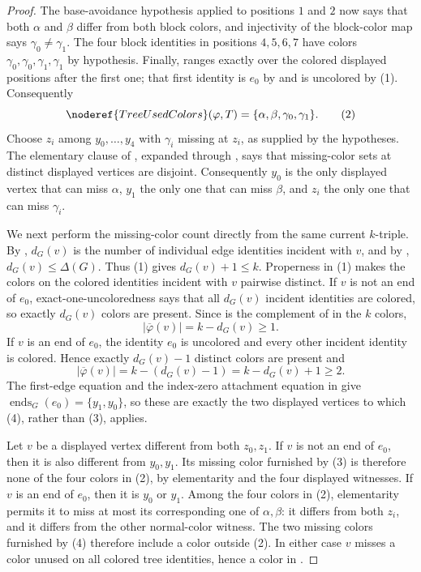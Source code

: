 \begin{proof}
The base-avoidance hypothesis applied to positions $1$ and $2$ now says
that both $\alpha$ and $\beta$ differ from both block colors, and
injectivity of the block-color map says
$\gamma_0\ne\gamma_1$.  The four block identities in positions
$4,5,6,7$ have colors $\gamma_0,\gamma_0,\gamma_1,\gamma_1$ by
hypothesis.  Finally,  ranges exactly over the
colored displayed positions after the first one; that first identity is
$e_0$ by  and is uncolored by (1).  Consequently
\[
 \noderef{TreeUsedColors}(\varphi,T)
   =\{\alpha,\beta,\gamma_0,\gamma_1\}.
\tag{2}
\]
Choose $z_i$ among $y_0,\ldots,y_4$ with $\gamma_i$ missing at $z_i$,
as supplied by the hypotheses.  The elementary clause of
, expanded through
, says that missing-color sets at
distinct displayed vertices are disjoint.  Consequently $y_0$ is the
only displayed vertex that can miss $\alpha$, $y_1$ the only one that can
miss $\beta$, and $z_i$ the only one that can miss $\gamma_i$.

We next perform the missing-color count directly from the same current
$k$-triple.  By , $d_G(v)$ is the number of individual
edge identities incident with $v$, and by ,
$d_G(v)\leq\Delta(G)$.  Thus (1) gives
$d_G(v)+1\leq k$.  Properness in (1) makes the colors on the colored
identities incident with $v$ pairwise distinct.  If $v$ is not an end of
$e_0$, exact-one-uncoloredness says that all $d_G(v)$ incident identities
are colored, so exactly $d_G(v)$ colors are present.  Since
 is the complement of
 in the $k$ colors,
\[
 |\overline\varphi(v)|=k-d_G(v)\geq1.              \tag{3}
\]
If $v$ is an end of $e_0$, the identity $e_0$ is uncolored and every
other incident identity is colored.  Hence exactly $d_G(v)-1$ distinct
colors are present and
\[
 |\overline\varphi(v)|=k-(d_G(v)-1)
   =k-d_G(v)+1\geq2.                               \tag{4}
\]
The first-edge equation and the index-zero attachment equation in
 give
$\operatorname{ends}_G(e_0)=\{y_1,y_0\}$, so these are exactly the two
displayed vertices to which (4), rather than (3), applies.

Let $v$ be a displayed vertex different from both $z_0,z_1$.  If $v$ is
not an end of $e_0$, then it is also different from $y_0,y_1$.  Its
missing color furnished by (3) is therefore none of the four colors in
(2), by elementarity and the four displayed witnesses.  If $v$ is an end
of $e_0$, then it is $y_0$ or $y_1$.  Among the four colors in (2),
elementarity permits it to miss at most its corresponding one of
$\alpha,\beta$: it differs from both $z_i$, and it differs from the other
normal-color witness.  The two missing colors furnished by (4) therefore
include a color outside (2).  In either case $v$ misses a color unused on
all colored tree identities, hence a color in
.


\end{proof}
